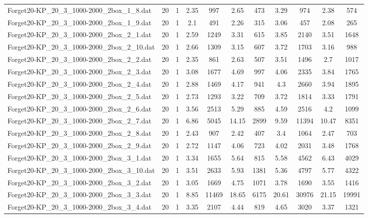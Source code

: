 \begin{table}[!ht]
\begin{tabular}{lcccccccccc}
Forget20-KP\_20\_3\_1000-2000\_2box\_1\_8.dat & 20 & 1 & 2.35 & 997 & 2.65 & 473 & 3.29 & 974 & 2.38 & 574 \\
Forget20-KP\_20\_3\_1000-2000\_2box\_1\_9.dat & 20 & 1 & 2.1 & 491 & 2.26 & 315 & 3.06 & 457 & 2.08 & 265 \\
Forget20-KP\_20\_3\_1000-2000\_2box\_2\_1.dat & 20 & 1 & 2.59 & 1249 & 3.31 & 615 & 3.85 & 2140 & 3.51 & 1648 \\
Forget20-KP\_20\_3\_1000-2000\_2box\_2\_10.dat & 20 & 1 & 2.66 & 1309 & 3.15 & 607 & 3.72 & 1703 & 3.16 & 988 \\
Forget20-KP\_20\_3\_1000-2000\_2box\_2\_2.dat & 20 & 1 & 2.35 & 861 & 2.63 & 507 & 3.51 & 1496 & 2.7 & 1017 \\
Forget20-KP\_20\_3\_1000-2000\_2box\_2\_3.dat & 20 & 1 & 3.08 & 1677 & 4.69 & 997 & 4.06 & 2335 & 3.84 & 1765 \\
Forget20-KP\_20\_3\_1000-2000\_2box\_2\_4.dat & 20 & 1 & 2.88 & 1469 & 4.17 & 941 & 4.3 & 2660 & 3.94 & 1895 \\
Forget20-KP\_20\_3\_1000-2000\_2box\_2\_5.dat & 20 & 1 & 2.73 & 1293 & 3.22 & 709 & 3.72 & 1814 & 3.33 & 1791 \\
Forget20-KP\_20\_3\_1000-2000\_2box\_2\_6.dat & 20 & 1 & 3.56 & 2513 & 5.29 & 885 & 4.59 & 2516 & 4.2 & 1099 \\
Forget20-KP\_20\_3\_1000-2000\_2box\_2\_7.dat & 20 & 1 & 6.86 & 5045 & 14.15 & 2899 & 9.59 & 11394 & 10.47 & 8351 \\
Forget20-KP\_20\_3\_1000-2000\_2box\_2\_8.dat & 20 & 1 & 2.43 & 907 & 2.42 & 407 & 3.4 & 1064 & 2.47 & 703 \\
Forget20-KP\_20\_3\_1000-2000\_2box\_2\_9.dat & 20 & 1 & 2.72 & 1147 & 4.06 & 723 & 4.02 & 2031 & 3.48 & 1768 \\
Forget20-KP\_20\_3\_1000-2000\_2box\_3\_1.dat & 20 & 1 & 3.34 & 1655 & 5.64 & 815 & 5.58 & 4562 & 6.43 & 4029 \\
Forget20-KP\_20\_3\_1000-2000\_2box\_3\_10.dat & 20 & 1 & 3.51 & 2633 & 5.93 & 1381 & 5.36 & 4797 & 5.77 & 4322 \\
Forget20-KP\_20\_3\_1000-2000\_2box\_3\_2.dat & 20 & 1 & 3.05 & 1669 & 4.75 & 1071 & 3.78 & 1690 & 3.55 & 1416 \\
Forget20-KP\_20\_3\_1000-2000\_2box\_3\_3.dat & 20 & 1 & 8.85 & 11469 & 18.65 & 6175 & 20.61 & 30976 & 21.15 & 19991 \\
Forget20-KP\_20\_3\_1000-2000\_2box\_3\_4.dat & 20 & 1 & 3.35 & 2107 & 4.44 & 819 & 4.65 & 3020 & 3.37 & 1321 \\

\end{tabular}
\end{table}
